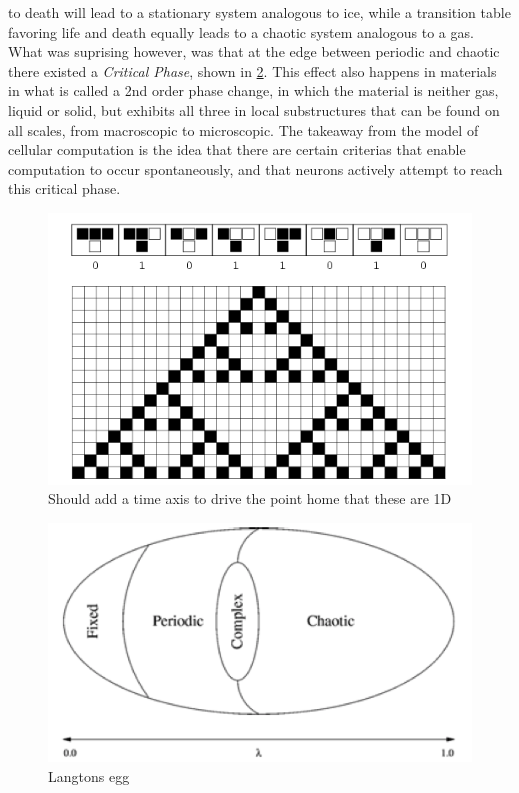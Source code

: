 to death will lead to a stationary system analogous to ice, while a transition
table favoring life and death equally leads to a chaotic system analogous to a
gas.
What was suprising however, was that at the edge between periodic and chaotic
there existed a \emph{Critical Phase}, shown in \ref{figCAegg}.
This effect also happens in materials in what is called a 2nd order phase
change, in which the material is neither gas, liquid or solid, but exhibits all
three in local substructures that can be found on all scales, from macroscopic
to microscopic.
The takeaway from the model of cellular computation is the idea that there are
certain criterias that enable computation to occur spontaneously, and that
neurons actively attempt to reach this critical phase.
\begin{figure}[h!]
  \centering
  \includegraphics[width=1\textwidth]{fig/ca22.png}
  \caption{Should add a time axis to drive the point home that these are 1D}
  \label{figCA22}
\end{figure}
\begin{figure}[h!]
  \centering
  \includegraphics[width=1\textwidth]{fig/Langtons_egg2.png}
  \caption{Langtons egg}
  \label{figCAegg}
\end{figure}
